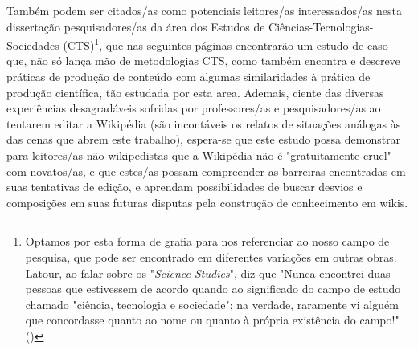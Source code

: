 Também podem ser citados/as como potenciais leitores/as interessados/as nesta dissertação pesquisadores/as da área dos Estudos de Ciências-Tecnologias-Sociedades (CTS)\footnote{Optamos por esta forma de grafia para nos referenciar ao nosso campo de pesquisa, que pode ser encontrado em diferentes variações em outras obras. Latour, ao falar sobre os "\textit{Science Studies}", diz que "Nunca encontrei duas pessoas que estivessem de acordo quando ao significado do campo de estudo chamado "ciência, tecnologia e sociedade"; na verdade, raramente vi alguém que concordasse quanto ao nome ou quanto à própria existência do campo!" (\cite[p.25]{latour_ciencia_1987})}, que nas seguintes páginas encontrarão um estudo de caso que, não só lança mão de metodologias CTS, como também encontra e descreve práticas de produção de conteúdo com algumas similaridades à prática de produção científica, tão estudada por esta area. Ademais, ciente das diversas experiências desagradáveis sofridas por professores/as e pesquisadores/as ao tentarem editar a Wikipédia (são incontáveis os relatos de situações análogas às das cenas que abrem este trabalho), espera-se que este estudo possa demonstrar para leitores/as não-wikipedistas que a Wikipédia não é "gratuitamente cruel" com novatos/as, e que estes/as possam compreender as barreiras encontradas em suas tentativas de edição, e aprendam possibilidades de buscar desvios e composições em suas futuras disputas pela construção de conhecimento em wikis.